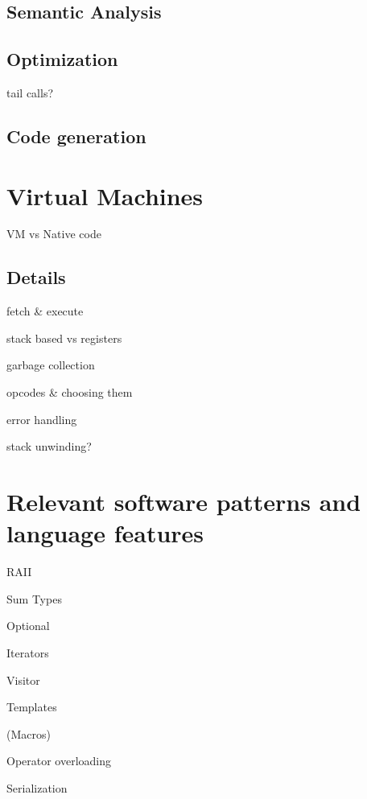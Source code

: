 		\subsection{Semantic Analysis}
		
		
		\subsection{Optimization}
		
			tail calls?
		
		\subsection{Code generation}

	\section{Virtual Machines}
	
		VM vs Native code
		
		\subsection{Details} %
			fetch \& execute
			
			stack based vs registers
			
			garbage collection
			
			opcodes \& choosing them
			
			error handling
			
			stack unwinding?
	
	\section{Relevant software patterns and language features}
	
		RAII
		
		Sum Types
		
		Optional
		
		Iterators
		
		Visitor
		
		Templates
		
		(Macros)
		
		Operator overloading
		
		Serialization
